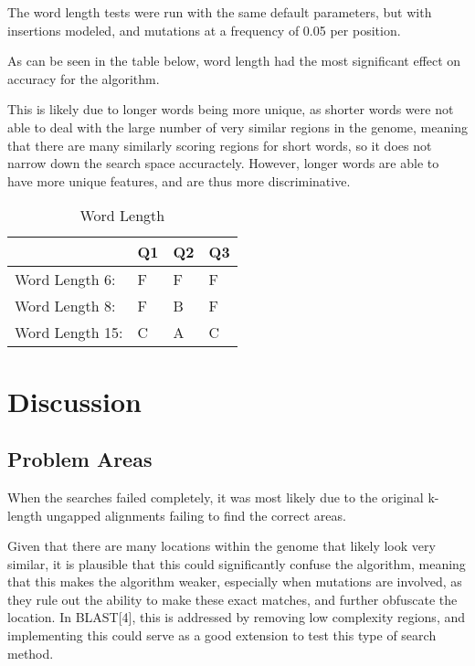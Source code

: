 \documentclass[12pt, conference]{IEEEtran}
\begin{document}
	The word length tests were run with the same default parameters, but with insertions modeled, and mutations at a frequency of 0.05 per position.
	
	As can be seen in the table below, word length had the most significant effect on accuracy for the algorithm.
	
	This is likely due to longer words being more unique, as shorter words were not able to deal with the large number of very similar regions in the genome, meaning that there are many similarly scoring regions for short words, so it does not narrow down the search space accuractely. However, longer words are able to have more unique features, and are thus more discriminative. 
	
		\begin{table}[htbp]
	\centering
	\caption{Word Length}
	\label{my-label}
	\begin{tabular}{|l|l|l|l|}
	\hline
										 & Q1 & Q2 & Q3 \\ \hline
	Word Length 6:     &  F & F  & F \\ \hline
	Word Length 8:     &  F & B  & F  \\ \hline
	Word Length 15:    &  C & A  & C  \\ \hline
	\end{tabular}
	\end{table}
	
	
\section{\textbf{Discussion}}

	\subsection{\textbf{Problem Areas}}
	
	When the searches failed completely, it was most likely due to the original k-length ungapped alignments failing to find the correct areas.
	
	Given that there are many locations within the genome that likely look very similar, it is plausible that this could significantly confuse the algorithm, meaning that this makes the algorithm weaker, especially when mutations are involved, as they rule out the ability to make these exact matches, and further obfuscate the location. In BLAST[4], this is addressed by removing low complexity regions, and implementing this could serve as a good extension to test this type of search method.
	
\end{document}
